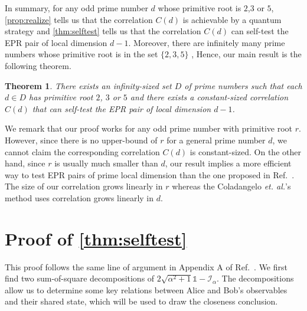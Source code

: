\documentclass[11pt,letterpaper]{article}
\newcommand{\ketbra}[2]{|#1\rangle\langle#2|}
\DeclareMathOperator{\Tr}{Tr}
\newcommand{\1}{\mathbb{1}}
\newcommand{\tA}{\tilde{A}}
\newcommand{\I}{\mathcal{I}}
\newtheorem{theorem}{Theorem}
\theoremstyle{definition}
\begin{document}
In summary, for any odd prime number $d$ whose primitive root is $2$,$3$ or $5$, 
\cref{prop:realize} tells us that the correlation $C(d)$ is achievable by a quantum strategy 
and \cref{thm:selftest} tells us that the correlation $C(d)$ can self-test the EPR pair of
local dimension $d-1$. Moreover, there are infinitely many prime numbers
whose primitive root is in the set $\{2,3,5\}$ \cite{murty1988},
Hence, our main result is the following theorem.
\begin{theorem}
	There exists an infinity-sized set $D$ of prime numbers such that 
	each $d \in D$ has primitive root $2$, $3$ or $5$ and there exists
	a constant-sized correlation $C(d)$ that can self-test the EPR pair of 
	local dimension $d-1$.
\end{theorem}
We remark that our proof works for any odd prime number with primitive root $r$.
However, since there is no upper-bound of $r$ for a general prime number $d$, we 
cannot claim the corresponding correlation $C(d)$ is constant-sized. On the other
hand, since $r$ is usually much smaller than $d$, our result implies a more efficient
way to test EPR pairs of prime local dimension than the one proposed in Ref.~\cite{cgs2017}.
The size of our correlation grows linearly in $r$ whereas the Coladangelo \textit{et. al.}'s
method uses correlation grows linearly in $d$.



\appendix
\section{Proof of \cref{thm:selftest} }
\label{sec:selftest}
This proof follows the same line of argument in Appendix A of Ref.~\cite{bamps2015}.
We first find two sum-of-square decompositions of $2\sqrt{\alpha^2+1} \1 - \I_\alpha$.
The decompositions allow us to determine some key relations between Alice and Bob's observables
and their shared state, which will be used to draw the closeness conclusion.
\end{document}
